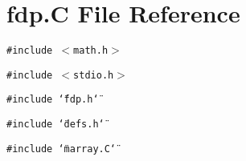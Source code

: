 \section{fdp.C File Reference}
\label{fdp_C}
{\tt \#include $<$math.h$>$}\par
{\tt \#include $<$stdio.h$>$}\par
{\tt \#include \char`\"{}fdp.h\char`\"{}}\par
{\tt \#include \char`\"{}defs.h\char`\"{}}\par
{\tt \#include \char`\"{}marray.C\char`\"{}}\par
